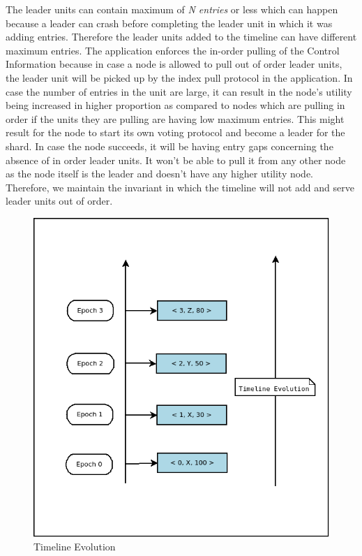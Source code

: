 \documentclass[12pt,a4paper,twoside,openright]{book}
\begin{document}
\par The leader units can contain maximum of \textit{N entries} or less which can happen because a leader can crash before completing the leader unit in which it was adding entries. Therefore the leader units added to the timeline can have different maximum entries. The application enforces the in-order pulling of the Control Information because in case a node is allowed to pull out of order leader units, the leader unit will be picked up by the index pull protocol in the application. In case the number of entries in the unit are large, it can result in the node's utility being increased in higher proportion as compared to nodes which are pulling in order if the units they are pulling are having low maximum entries. This might result for the node to start its own voting protocol and  become a leader for the shard. In case the node succeeds, it will be having entry gaps concerning the absence of in order leader units. It won't be able to pull it from any other node as the node itself is the leader and doesn't have any higher utility node. Therefore, we maintain the invariant in which the timeline will not add and serve leader units out of order. 

\begin{figure}
	\includegraphics[scale=0.5]{timeline_new}
	\centering
	\caption{Timeline Evolution}
	\label{fig:timeline}
\end{figure}
\end{document}
